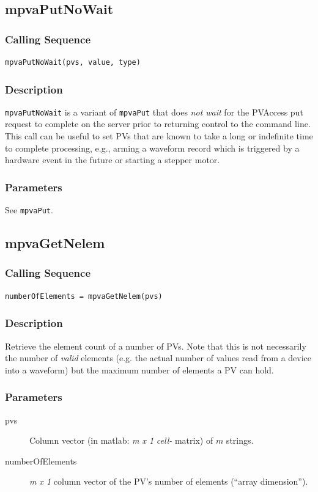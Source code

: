 \documentclass{article}
\newcommand{\com}[1]{{\tt #1}}
\newcommand{\pbrk}{\pagebreak[3]}
\newcommand{\pbrkf}{\pagebreak}
\newcommand{\ita}[1]{\emph{#1}}
\newcommand{\m}{$m$}
\newcommand{\mhack}{$m$} %
\newcommand{\mxl}{$m\times 1$}
\renewcommand{\m}{\ita{m}}
\newcommand{\mhack}{\ita{m}} %
\renewcommand{\mxl}{\ita{m x 1}}
\renewcommand{\pbrk}{}
\renewcommand{\pbrkf}{}
\newcommand{\PVITEM}{
\item[pvs] Column vector (in matlab: \mxl{} \ita{cell-} matrix)
of \mhack{} strings.
}
\begin{document}
\vspace*{\fill}
\pbrkf
\subsection{mpvaPutNoWait}
\label{mpvaputnowait}
\subsubsection{Calling Sequence}
\begin{verbatim}
mpvaPutNoWait(pvs, value, type)
\end{verbatim}
\subsubsection{Description}
\com{mpvaPutNoWait} is a variant of \com{mpvaPut} that does {\em not wait}
for the PVAccess put request to complete on the server prior to
returning control to the command line.
This call can be useful to set PVs that are known to take a long
or indefinite time to complete processing, e.g., arming a waveform record
which is triggered by a hardware event in the future or starting a stepper
motor.

\subsubsection{Parameters}
See \com{mpvaPut}.

\vspace*{\fill}
\pbrk
\subsection{mpvaGetNelem}
\subsubsection{Calling Sequence}
\begin{verbatim}
numberOfElements = mpvaGetNelem(pvs)
\end{verbatim}
\subsubsection{Description}
Retrieve the element count of a number of PVs. Note that this is not
necessarily the number of \ita{valid} elements (e.g. the actual number
of values read from a device into a waveform) but the maximum number
of elements a PV can hold.
\subsubsection{Parameters}
\begin{description}
\PVITEM
\item[numberOfElements] \mxl{} column vector of the PV's number
of elements (``array dimension'').
\end{description}
\end{document}

